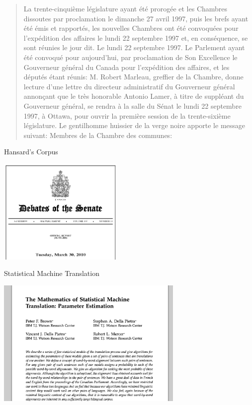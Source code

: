 \documentclass{beamer}
\begin{document}
\begin{frame}
  \begin{small}
  \begin{quote}
    La trente-cinquième législature ayant été prorogée et les Chambres dissoutes par proclamation le dimanche 27 avril 1997, puis les brefs ayant été émis et rapportés, les nouvelles Chambres ont été convoquées pour l'expédition des affaires le lundi 22 septembre 1997 et, en conséquence, se sont réunies le jour dit.  
Le lundi 22 septembre 1997.  
Le Parlement ayant été convoqué pour aujourd'hui, par proclamation de Son Excellence le Gouverneur général du Canada pour l'expédition des affaires, et les députés étant réunis: 
M. Robert Marleau, greffier de la Chambre, donne lecture d'une lettre du directeur administratif du Gouverneur général annonçant que le très honorable Antonio Lamer, à titre de suppléant du Gouverneur général, se rendra à la salle du Sénat le lundi 22 septembre 1997, à Ottawa, pour ouvrir la première session de la trente-sixième législature.  
Le gentilhomme huissier de la verge noire apporte le message suivant: 
Membres de la Chambre des communes: 

  \end{quote}
  \end{small}
\end{frame}

\begin{frame}{Hansard's Corpus}
  \begin{center}
    \includegraphics[width=6cm]{hansards}
  \end{center}
\end{frame}

\begin{frame}{Statistical Machine Translation}
  \begin{center}
    \includegraphics[width=9cm]{mathofmt}
  \end{center}
\end{frame}
\end{document}
